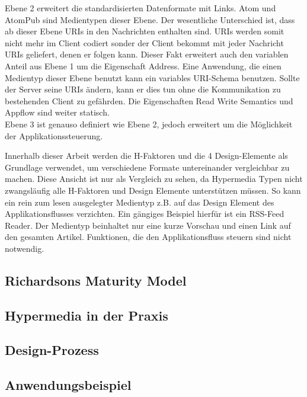 Ebene 2 erweitert die standardisierten Datenformate mit Links. Atom und AtomPub sind Medientypen dieser Ebene. Der wesentliche Unterschied ist, dass ab dieser Ebene URIs in den Nachrichten enthalten sind. URIs werden somit nicht mehr im Client codiert sonder der Client bekommt mit jeder Nachricht URIs geliefert, denen er folgen kann. Dieser Fakt erweitert auch den variablen Anteil aus Ebene 1 um die Eigenschaft Address. Eine Anwendung, die einen Medientyp dieser Ebene benutzt kann ein variables URI-Schema benutzen. Sollte der Server seine URIs ändern, kann er dies tun ohne die Kommunikation zu bestehenden Client zu gefährden. Die Eigenschaften Read Write Semantics und Appflow sind weiter statisch.\\
Ebene 3 ist genauso definiert wie Ebene 2, jedoch erweitert um die Möglichkeit der Applikationssteuerung.



Innerhalb dieser Arbeit werden die H-Faktoren und die 4 Design-Elemente als Grundlage verwendet, um verschiedene Formate untereinander vergleichbar zu machen. Diese Ansicht ist nur als Vergleich zu sehen, da Hypermedia Typen nicht zwangsläufig alle H-Faktoren und Design Elemente unterstützen müssen. So kann ein rein zum lesen ausgelegter Medientyp z.B. auf das Design Element des Applikationsflusses verzichten. Ein gängiges Beispiel hierfür ist ein RSS-Feed Reader. Der Medientyp beinhaltet nur eine kurze Vorschau und einen Link auf den gesamten Artikel. Funktionen, die den Applikationsfluss steuern sind nicht notwendig.

\subsection{Richardsons Maturity Model}


\subsection{Hypermedia in der Praxis}

\subsection{Design-Prozess}


\subsection{Anwendungsbeispiel}
